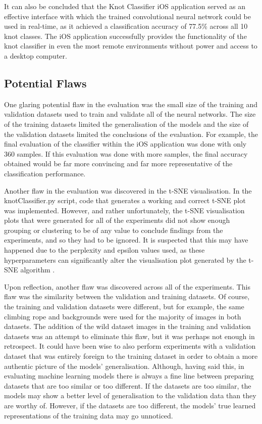\documentclass{l4proj}
\begin{document}
It can also be concluded that the Knot Classifier iOS application served as an effective interface with which the trained convolutional neural network could be used in real-time, as it achieved a classification accuracy of 77.5\% across all 10 knot classes. The iOS application successfully provides the functionality of the knot classifier in even the most remote environments without power and access to a desktop computer.

\subsection{Potential Flaws}
One glaring potential flaw in the evaluation was the small size of the training and validation datasets used to train and validate all of the neural networks.
The size of the training datasets limited the generalisation of the models and the size of the validation datasets limited the conclusions of the evaluation.
For example, the final evaluation of the classifier within the iOS application was done with only 360 samples.
If this evaluation was done with more samples, the final accuracy obtained would be far more convincing and far more representative of the classification performance.

Another flaw in the evaluation was discovered in the t-SNE visualisation.
In the knotClassifier.py script, code that generates a working and correct t-SNE plot was implemented.
However, and rather unfortunately, the t-SNE visualisation plots that were generated for all of the experiments did not show enough grouping or clustering to be of any value to conclude findings from the experiments, and so they had to be ignored.
It is suspected that this may have happened due to the perplexity and epsilon values used, as these hyperparameters can significantly alter the visualisation plot generated by the t-SNE algorithm \cite{wattenberg2016how}.

Upon reflection, another flaw was discovered across all of the experiments.
This flaw was the similarity between the validation and training datasets.
Of course, the training and validation datasets were different, but for example, the same climbing rope and backgrounds were used for the majority of images in both datasets.
The addition of the wild dataset images in the training and validation datasets was an attempt to eliminate this flaw, but it was perhaps not enough in retrospect.
It could have been wise to also perform experiments with a validation dataset that was entirely foreign to the training dataset in order to obtain a more authentic picture of the models' generalisation.
Although, having said this, in evaluating machine learning models there is always a fine line between preparing datasets that are too similar or too different.
If the datasets are too similar, the models may show a better level of generalisation to the validation data than they are worthy of.
However, if the datasets are too different, the models' true learned representations of the training data may go unnoticed.   
\end{document}
